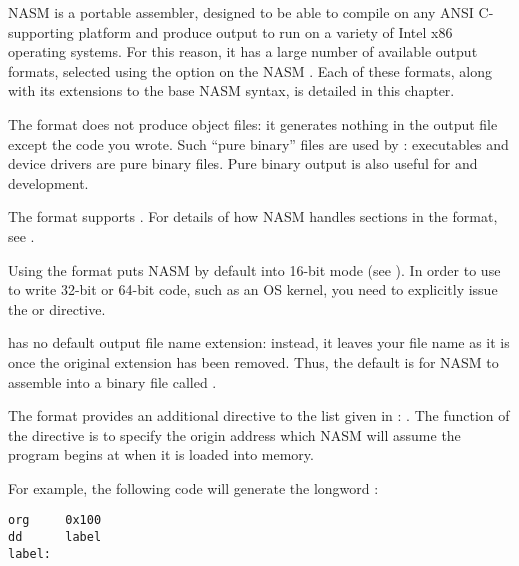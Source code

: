 %
%

NASM is a portable assembler, designed to be able to compile on any
ANSI C-supporting platform and produce output to run on a variety of
Intel x86 operating systems. For this reason, it has a large number
of available output formats, selected using the  option
on the NASM . Each of these formats, along with
its extensions to the base NASM syntax, is detailed in this chapter.


The  format does not produce object files: it generates
nothing in the output file except the code you wrote. Such ``pure
binary'' files are used by : 
executables and  device drivers are pure binary
files. Pure binary output is also useful for 
and  development.

The  format supports .
For details of how NASM handles sections in the  format,
see .

Using the  format puts NASM by default into 16-bit mode
(see ). In order to use  to write 32-bit
or 64-bit code, such as an OS kernel, you need to explicitly issue
the  or 
directive.

 has no default output file name extension: instead, it
leaves your file name as it is once the original extension has been
removed. Thus, the default is for NASM to assemble 
into a binary file called .


The  format provides an additional directive to the list
given in : . The function of the
 directive is to specify the origin address which NASM
will assume the program begins at when it is loaded into memory.

For example, the following code will generate the longword
:

\begin{lstlisting}
org     0x100
dd      label
label:
\end{lstlisting}

